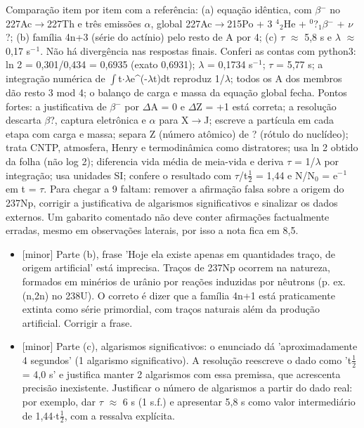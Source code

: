 \documentclass{article}%
\begin{document}
Comparação item por item com a referência: (a) equação idêntica, com $\beta$$^{-}$ no 227Ac$\to$227Th e três emissões $\alpha$, global 227Ac$\to$215Po + 3 $^{4}$$_{2}$He + $^{0}$?$_{1}$$\beta$$^{-}$ + $\nu$?; (b) família 4n+3 (série do actínio) pelo resto de A por 4; (c) $\tau$ $\approx$ 5,8 s e $\lambda$ $\approx$ 0,17 s$^{-}$$^{1}$. Não há divergência nas respostas finais. Conferi as contas com python3: ln 2 = 0,301/0,434 = 0,6935 (exato 0,6931); $\lambda$ = 0,1734 s$^{-}$$^{1}$; $\tau$ = 5,77 s; a integração numérica de $\int$t$\cdot$$\lambda$e\^{}(-$\lambda$t)dt reproduz 1/$\lambda$; todos os A dos membros dão resto 3 mod 4; o balanço de carga e massa da equação global fecha.\newline%
\newline%
Pontos fortes: a justificativa de $\beta$$^{-}$ por $\Delta$A = 0 e $\Delta$Z = +1 está correta; a resolução descarta $\beta$?, captura eletrônica e $\alpha$ para X$\to$J; escreve a partícula em cada etapa com carga e massa; separa Z (número atômico) de ? (rótulo do nuclídeo); trata CNTP, atmosfera, Henry e termodinâmica como distratores; usa ln 2 obtido da folha (não log 2); diferencia vida média de meia{-}vida e deriva $\tau$ = 1/$\lambda$ por integração; usa unidades SI; confere o resultado com $\tau$/t$\frac12$ = 1,44 e N/N$_{0}$ = e$^{-}$$^{1}$ em t = $\tau$.\newline%
\newline%
Para chegar a 9 faltam: remover a afirmação falsa sobre a origem do 237Np, corrigir a justificativa de algarismos significativos e sinalizar os dados externos. Um gabarito comentado não deve conter afirmações factualmente erradas, mesmo em observações laterais, por isso a nota fica em 8,5.%
\begin{itemize}%
\item%
{[}minor{]} Parte (b), frase 'Hoje ela existe apenas em quantidades traço, de origem artificial' está imprecisa. Traços de 237Np ocorrem na natureza, formados em minérios de urânio por reações induzidas por nêutrons (p. ex. (n,2n) no 238U). O correto é dizer que a família 4n+1 está praticamente extinta como série primordial, com traços naturais além da produção artificial. Corrigir a frase.%
\item%
{[}minor{]} Parte (c), algarismos significativos: o enunciado dá 'aproximadamente 4 segundos' (1 algarismo significativo). A resolução reescreve o dado como 't$\frac12$ = 4,0 s' e justifica manter 2 algarismos com essa premissa, que acrescenta precisão inexistente. Justificar o número de algarismos a partir do dado real: por exemplo, dar $\tau$ $\approx$ 6 s (1 s.f.) e apresentar 5,8 s como valor intermediário de 1,44$\cdot$t$\frac12$, com a ressalva explícita.%

\end{itemize}$$
\end{document}
